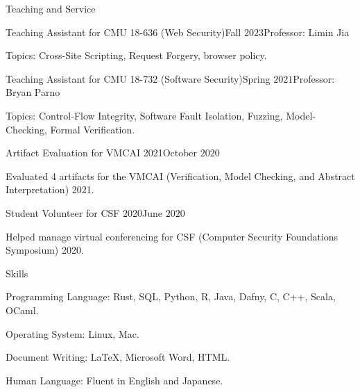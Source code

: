 \documentclass{resume} %
\begin{document}
\begin{rSection}{Teaching and Service}
  \begin{rSubsection}{Teaching Assistant for CMU 18-636 (Web
      Security)}{Fall $2023$}{Professor: Limin Jia}{}
  \item Topics: Cross-Site Scripting, Request Forgery, browser policy.
  \end{rSubsection}

  \begin{rSubsection}{Teaching Assistant for CMU 18-732 (Software
      Security)}{Spring $2021$}{Professor: Bryan Parno}{}
  \item Topics: Control-Flow Integrity, Software Fault Isolation,
    Fuzzing, Model-Checking, Formal Verification.
  \end{rSubsection}

  \begin{rSubsection}{Artifact Evaluation for VMCAI 2021}{October $2020$}
    {}{}
  \item Evaluated 4 artifacts for the VMCAI (Verification, Model
    Checking, and Abstract Interpretation) 2021.
  \end{rSubsection}

  \begin{rSubsection}{Student Volunteer for CSF 2020}{June $2020$}
    {}{}
  \item Helped manage virtual conferencing for CSF
    (Computer Security Foundations Symposium) 2020.
  \end{rSubsection}
\end{rSection}

\begin{rSection}{Skills}
  \begin{rSubsection}{}{}{}{}
  \item Programming Language: Rust, SQL, Python, R, Java, Dafny, C, C++, Scala, OCaml.
  \item Operating System: Linux, Mac.
  \item Document Writing: LaTeX, Microsoft Word, HTML.
  \item Human Language: Fluent in English and Japanese.
  \end{rSubsection}
\end{rSection}
\end{document}
